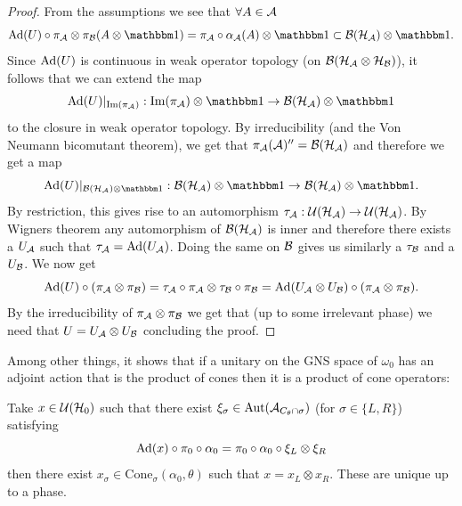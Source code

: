 \documentclass[11pt,a4paper,twoside]{article}
\numberwithin{equation}{section}
\begin{document}
	\begin{proof}
		From the assumptions we see that $\forall A\in\AA$
		\begin{equation}
			\Ad{U}\circ\pi_\AA\otimes\pi_\BB(A\otimes\id)=\pi_\AA\circ\alpha_\AA(A)\otimes\id\subset \BB(\HH_\AA)\otimes\id.
		\end{equation}
		Since $\Ad{U}$ is continuous in weak operator topology (on $\BB(\HH_{\AA}\otimes\HH_{\BB})$), it follows that we can extend the map
		\begin{equation}
			\Ad{U}|_{\textrm{Im}(\pi_\AA)}:\textrm{Im}(\pi_\AA)\otimes\id\rightarrow \BB(\HH_\AA)\otimes\id
		\end{equation}
		to the closure in weak operator topology. By irreducibility (and the Von Neumann bicomutant theorem), we get that $\pi_\AA(\AA)''=\BB(\HH_\AA)$ and therefore we get a map
		\begin{equation}
			\Ad{U}|_{\BB(\HH_\AA)\otimes\id}:\BB(\HH_\AA)\otimes\id\rightarrow \BB(\HH_\AA)\otimes\id.
		\end{equation}
		By restriction, this gives rise to an automorphism $\tau_\AA:\UU(\HH_\AA)\rightarrow\UU(\HH_\AA)$. By Wigners theorem any automorphism of $\BB(\HH_\AA)$ is inner and therefore there exists a $U_\AA$ such that $\tau_\AA=\Ad{U_\AA}$. Doing the same on $\BB$ gives us similarly a $\tau_\BB$ and a $U_\BB$. We now get
		\begin{equation}
			\Ad{U}\circ(\pi_\AA\otimes\pi_\BB)=\tau_\AA\circ\pi_\AA\otimes\tau_\BB\circ\pi_\BB=\Ad{U_\AA\otimes U_\BB}\circ(\pi_\AA\otimes\pi_\BB).
		\end{equation}
		By the irreducibility of $\pi_\AA\otimes\pi_\BB$ we get that (up to some irrelevant phase) we need that $U=U_\AA\otimes U_\BB$ concluding the proof.
	\end{proof}
	Among other things, it shows that if a unitary on the GNS space of $\omega_0$ has an adjoint action that is the product of cones then it is a product of cone operators:
	\begin{lemma}\label{lem:UsingIrreducibilityAndWignerTheorem}
		Take $x\in\UU(\HH_0)$ such that there exist $\xi_\sigma\in\Aut{\AA_{C_\theta\cap\sigma}}$ (for $\sigma\in\{L,R\}$) satisfying
		\begin{equation}
			\Ad{x}\circ\pi_0\circ\alpha_0=\pi_0\circ\alpha_0\circ\xi_L\otimes\xi_R
		\end{equation}
		then there exist $x_\sigma\in\textrm{Cone}_\sigma(\alpha_0,\theta)$ such that $x=x_L\otimes x_R$. These are unique up to a phase.
	\end{lemma}
\end{document}
